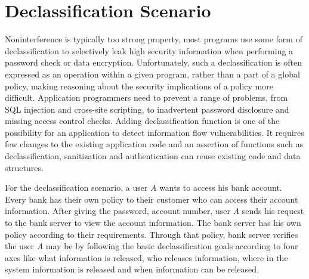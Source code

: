 \section{Declassification Scenario}
 Noninterference is typically
 too strong property, most programs use some form of declassification to selectively leak high security information when performing a password check or data encryption. Unfortunately, such  a declassification is often expressed as an operation within a given  program, rather than a part of a global policy, making reasoning about the security implications of a policy more difficult. Application programmers need to prevent a range of problems, from SQL injection and cross-site scripting, to inadvertent password disclosure and missing access control checks. Adding declassification function is one of the possibility for an application to detect information flow vulnerabilities. It requires few changes to the existing application code and an assertion of functions such as declassification, sanitization and authentication can reuse existing code and data structures. 
 
 For the declassification scenario, a user \emph{A} wants to access his bank account. Every bank has their own policy to their customer who can access their account information. After giving the password, account number, user \emph{A} sends his request to the bank server to view the account information. The bank server has his own policy according to their requirements. Through that policy, bank server verifies the user \emph{A} may be by following the basic declassification goals according to four axes like what information is released,
 who releases information, where in the system information is released and when information can be released. 
 
